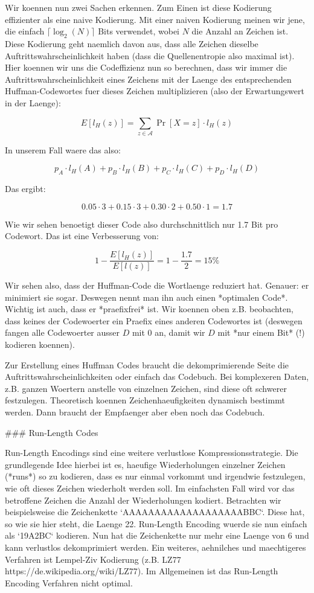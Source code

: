 Wir koennen nun zwei Sachen erkennen. Zum Einen ist diese Kodierung effizienter
als eine naive Kodierung. Mit einer naiven Kodierung meinen wir jene, die
einfach $\lceil\log_2(N)\rceil$ Bits verwendet, wobei $N$ die Anzahl an Zeichen
ist. Diese Kodierung geht naemlich davon aus, dass alle Zeichen dieselbe
Auftrittswahrscheinlichkeit haben (dass die Quellenentropie also maximal
ist). Hier koennen wir uns die Codeffizienz nun so berechnen, dass wir immer die
Auftrittswahrscheinlichkeit eines Zeichens mit der Laenge des entsprechenden
Huffman-Codewortes fuer dieses Zeichen multiplizieren (also der Erwartungswert
in der Laenge):

$$E[l_H(z)] = \sum_{z \in \mathcal{A}} \Pr[X = z] \cdot l_H(z)$$

In unserem Fall waere das also:

$$p_A \cdot l_H(A) + p_B \cdot l_H(B) + p_C \cdot l_H(C) + p_D \cdot l_H(D)$$

Das ergibt:

$$0.05 \cdot 3 + 0.15 \cdot 3 + 0.30 \cdot 2 + 0.50 \cdot 1 = 1.7$$

Wie wir sehen benoetigt dieser Code also durchschnittlich nur 1.7 Bit pro
Codewort. Das ist eine Verbesserung von:

$$1 - \frac{E[l_H(z)]}{E[l(z)]} = 1 - \frac{1.7}{2} = 15\%$$

Wir sehen also, dass der Huffman-Code die Wortlaenge reduziert hat. Genauer: er
minimiert sie sogar. Deswegen nennt man ihn auch einen *optimalen Code*. Wichtig
ist auch, dass er *praefixfrei* ist. Wir koennen oben z.B. beobachten, dass
keines der Codewoerter ein Praefix eines anderen Codewortes ist (deswegen fangen
alle Codewoerter ausser $D$ mit 0 an, damit wir $D$ mit *nur einem Bit* (!)
kodieren koennen).

Zur Erstellung eines Huffman Codes braucht die dekomprimierende Seite die
Auftrittswahrscheinlichkeiten oder einfach das Codebuch. Bei komplexeren Daten,
z.B. ganzen Woertern anstelle von einzelnen Zeichen, sind diese oft schwerer
festzulegen. Theoretisch koennen Zeichenhaeufigkeiten dynamisch bestimmt
werden. Dann braucht der Empfaenger aber eben noch das Codebuch.

### Run-Length Codes

Run-Length Encodings sind eine weitere verlustlose Kompressionsstrategie. Die
grundlegende Idee hierbei ist es, haeufige Wiederholungen einzelner Zeichen
(*runs*) so zu kodieren, dass es nur einmal vorkommt und irgendwie festzulegen,
wie oft dieses Zeichen wiederholt werden soll. Im einfachsten Fall wird vor das
betroffene Zeichen die Anzahl der Wiederholungen kodiert.  Betrachten wir
beispielsweise die Zeichenkette `AAAAAAAAAAAAAAAAAAABBC`. Diese hat, so wie sie
hier steht, die Laenge 22. Run-Length Encoding wuerde sie nun einfach als
`19A2BC` kodieren. Nun hat die Zeichenkette nur mehr eine Laenge von 6 und kann
verlustlos dekomprimiert werden. Ein weiteres, aehnilches und maechtigeres
Verfahren ist Lempel-Ziv Kodierung (z.B. LZ77
https://de.wikipedia.org/wiki/LZ77). Im Allgemeinen ist das Run-Length Encoding
Verfahren nicht optimal.
